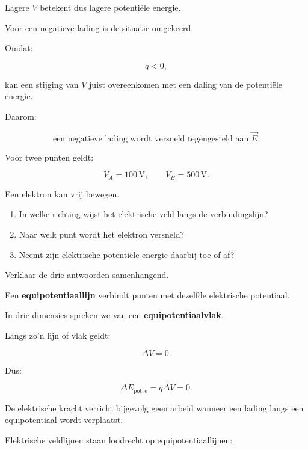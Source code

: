 \documentclass{ximera}
\begin{document}
Lagere $V$ betekent dus lagere potentiële energie.


Voor een negatieve lading is de situatie omgekeerd.

Omdat:

\[
q<0,
\]

kan een stijging van $V$ juist overeenkomen met een daling van de
potentiële energie.

Daarom:

\[
\boxed{
\text{een negatieve lading wordt versneld tegengesteld aan }\vec E.
}
\]


\begin{oefening}{\oefU\ESS}

Voor twee punten geldt:

\[
V_A=100\,\mathrm V,
\qquad
V_B=500\,\mathrm V.
\]

Een elektron kan vrij bewegen.

\begin{enumerate}
  \item In welke richting wijst het elektrische veld langs de
        verbindingslijn?
  \item Naar welk punt wordt het elektron versneld?
  \item Neemt zijn elektrische potentiële energie daarbij toe of af?
\end{enumerate}

Verklaar de drie antwoorden samenhangend.

\end{oefening}




Een \textbf{equipotentiaallijn} verbindt punten met dezelfde
elektrische potentiaal.

In drie dimensies spreken we van een
\textbf{equipotentiaalvlak}.

Langs zo'n lijn of vlak geldt:

\[
\Delta V=0.
\]

Dus:

\[
\Delta E_{\mathrm{pot,e}}=q\Delta V=0.
\]

De elektrische kracht verricht bijgevolg geen arbeid wanneer een
lading langs een equipotentiaal wordt verplaatst.


Elektrische veldlijnen staan loodrecht op equipotentiaallijnen:
\end{document}
